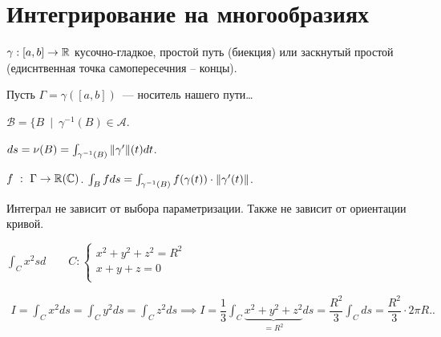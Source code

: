\section{Интегрирование на многообразиях}

\begin{definition}
    $\gamma: [a,b] \to \mathbb{R}$ кусочно-гладкое, простой путь (биекция) или заскнутый простой (едиснтвенная точка самопересечния -- концы).

    Пусть $\Gamma = \gamma ([a, b])$~--- носитель нашего пути\dots

    $\mathscr{B} = \{ B~\mid~ \gamma^{-1} (B) \in \mathscr{A}$.

    $ds = \nu(B) = \int_{\gamma^{-1}(B)} \|\gamma^{\prime}\|(t)dt$.

    $f~:~ \Gamma \to \mathbb{R}(\mathbb{C})$. $\int_B f ds = \int_{\gamma^{-1} (B) } f (\gamma(t)) \cdot \| \gamma^{\prime} (t) \|$.

    Интеграл не зависит от выбора параметризации. Также не зависит от ориентации кривой.
\end{definition}

\begin{example}
    $\int_C x^2sd\qquad C: \begin{cases}
        x^2+y^2+z^2 = R^2\\
         x+y+z = 0\\
    \end{cases}$

    \begin{align*}
        I = \int_C x^2ds = \int_C y^2ds = \int_C z^2ds
        \implies I = \dfrac{1}{3 } \int_C \underbrace{x^2 + y^2 + z^2}_{= R^2} ds = \dfrac{R^2} {3} \int_C ds = \dfrac{R^2} {3} \cdot 2\pi R.
        .\end{align*}
\end{example}

